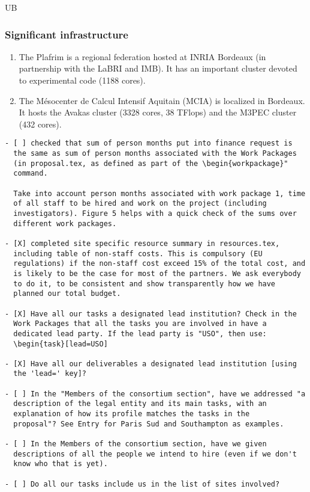 \begin{sitedescription}{UB}
\subsubsection*{Significant infrastructure}
\begin{enumerate}
\item The Plafrim is a regional federation hosted at INRIA Bordeaux (in partnership with the LaBRI and IMB). It has an important cluster devoted to experimental code (1188 cores).
\item The M\'esocenter de Calcul Intensif Aquitain (MCIA) is localized
in Bordeaux. It hosts the Avakas cluster (3328 cores,  38 TFlops) and the
M3PEC cluster (432 cores).
\end{enumerate}

\end{sitedescription}


\begin{draft}
\vspace{1cm}

\begin{verbatim}
- [ ] checked that sum of person months put into finance request is
  the same as sum of person months associated with the Work Packages
  (in proposal.tex, as defined as part of the \begin{workpackage}"
  command.
  
  Take into account person months associated with work package 1, time
  of all staff to be hired and work on the project (including
  investigators). Figure 5 helps with a quick check of the sums over
  different work packages.

- [X] completed site specific resource summary in resources.tex,
  including table of non-staff costs. This is compulsory (EU
  regulations) if the non-staff cost exceed 15% of the total cost, and
  is likely to be the case for most of the partners. We ask everybody
  to do it, to be consistent and show transparently how we have
  planned our total budget.

- [X] Have all our tasks a designated lead institution? Check in the
  Work Packages that all the tasks you are involved in have a
  dedicated lead party. If the lead party is "USO", then use:
  \begin{task}[lead=USO]

- [X] Have all our deliverables a designated lead institution [using
  the 'lead=' key]?

- [ ] In the "Members of the consortium section", have we addressed "a
  description of the legal entity and its main tasks, with an
  explanation of how its profile matches the tasks in the
  proposal"? See Entry for Paris Sud and Southampton as examples.

- [ ] In the Members of the consortium section, have we given
  descriptions of all the people we intend to hire (even if we don't
  know who that is yet). 
  
- [ ] Do all our tasks include us in the list of sites involved?
\end{verbatim}
\end{draft}

